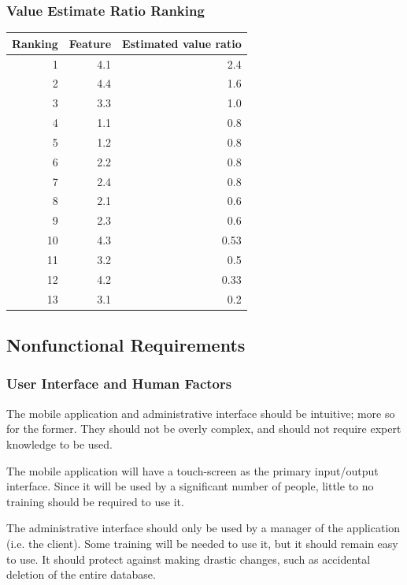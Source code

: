 \documentclass[a4paper, 11pt, titlepage]{article}
\begin{document}
\subsubsection{Value Estimate Ratio Ranking}
\begin{table}[H]
  \centering
    \begin{tabular}{rrr}
    \hline
    Ranking & Feature & Estimated value ratio \\
    \hline
       1 & 4.1   &   2.4   \\
       2 & 4.4   &   1.6   \\
       3 & 3.3   &   1.0   \\
       4 & 1.1   &   0.8    \\
       5 & 1.2  &    0.8   \\
       6 & 2.2  &    0.8   \\
       7 & 2.4   &   0.8    \\
       8 & 2.1   &   0.6     \\
       9 & 2.3  &    0.6   \\
       10 & 4.3   &   0.53     \\
       11 & 3.2   &   0.5     \\
       12 & 4.2   &   0.33     \\
       13 & 3.1   &   0.2    \\
    \hline
    \end{tabular}%
  \label{tab:value-estimate-ratio}%
\end{table}%


\subsection{Nonfunctional Requirements}
\subsubsection{User Interface and Human Factors}
The mobile application and administrative interface should be intuitive; more so for the former. They should not be overly complex, and should not require expert knowledge to be used. 

The mobile application will have a touch-screen as the primary input/output interface. Since it will be used by a significant number of people, little to no training should be required to use it. 

The administrative interface should only be used by a manager of the application (i.e. the client). Some training will be needed to use it, but it should remain easy to use. It should protect against making drastic changes, such as accidental deletion of the entire database.
\end{document}

